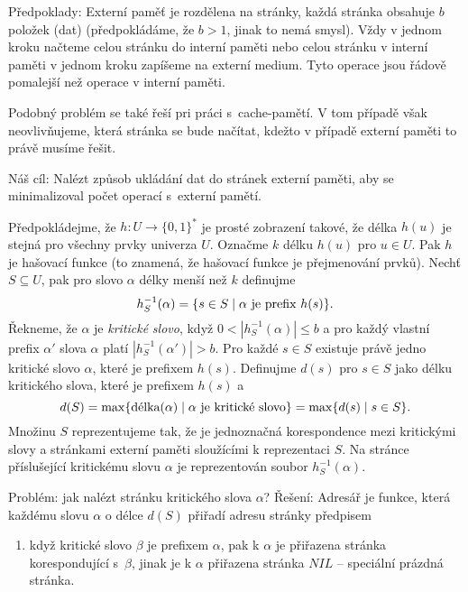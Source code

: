 \documentclass[a4paper,12pt]{article}
\begin{document}
Předpoklady:  Ex\-ter\-ní pa\-měť je roz\-dě\-le\-na na 
strán\-ky, kaž\-dá strán\-ka ob\-sa\-hu\-je $b$ po\-lo\-žek (dat) 
(předpokládáme, že $b>1$, jinak to nemá smysl).  Vždy v 
jednom kroku načteme celou stránku do interní paměti 
nebo celou stránku v interní paměti v jednom kroku 
zapíšeme na externí medium.  Tyto operace jsou řádově 
pomalejší než operace v interní paměti.  

Podobný problém se také řeší pri práci s~cache-pamětí. V tom případě však 
neovlivňujeme, která stránka se bude načítat, kdežto v případě externí paměti to právě musíme řešit.

Náš cíl:  
Nalézt způsob ukládání dat do stránek externí 
paměti, aby se minimalizoval počet operací s~externí 
pamětí.  

Předpokládejme, že $h:U\to \{0,1\}^{*}$ je prosté 
zobrazení takové, že délka $h(u)$ je stejná pro všechny prvky 
univerza $U$.  Označme $k$ délku $h(u)$ pro $u\in U$. Pak $
h$ je 
hašovací funkce (to znamená, že hašovací funkce je přejmenování prvků).  Nechť $S\subseteq U$, pak pro slovo $
\alpha$ délky 
menší než $k$ definujme 
$$h^{-1}_S(\alpha )=\{s\in S\mid\alpha\text{\rm\ je prefix }h(s)\}
.$$
Řekneme, že $\alpha$ je \emph{kritické} \emph{slovo}, když 
$0<|h^{-1}_S(\alpha )|\le b$ a pro každý vlastní prefix $
\alpha'$ slova $\alpha$ platí 
$|h^{-1}_S(\alpha')|>b$.  Pro každé $s\in S$ existuje právě jedno 
kritické slovo $\alpha$, které je prefixem $h(s)$.  Definujme $
d(s)$ 
pro $s\in S$ jako délku kritického slova, které je prefixem 
$h(s)$ a 
$$d(S)=\max\{\text{\rm délka}(\alpha )\mid\alpha\text{\rm\ je kritické slovo}
\}=\max\{d(s)\mid s\in S\}.$$
Množinu $S$ reprezentujeme tak, že je jednoznačná 
korespondence mezi kritickými slovy a stránkami externí 
paměti slouží\-cí\-mi k reprezentaci $S$.  Na stránce 
příslušející kritickému slovu $\alpha$ je reprezentován soubor 
$h^{-1}_S(\alpha )$.  

Problém: jak nalézt stránku kritického slova 
$\alpha$?\newline 
Řešení: Adresář je funkce, která každému slovu $
\alpha$ o 
délce $d(S)$ přiřadí adresu stránky předpisem
\begin{enumerate}
\item když kritické slovo $\beta$ je prefixem $\alpha$, pak k $
\alpha$ je 
přiřazena strán\-ka korespondující s~$\beta$, jinak je k $
\alpha$ 
přiřazena strán\-ka $NIL$ -- speciální prázdná stránka.
\end{enumerate}
\end{document}

